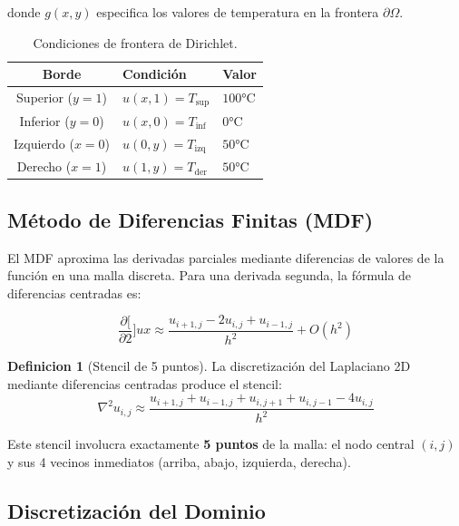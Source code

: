 \documentclass[12pt,a4paper]{article}
\theoremstyle{definition}
\newtheorem{definition}{Definicion}[section]
\newcommand{\diff}[2]{\frac{\partial #1}{\partial #2}}
\begin{document}
donde $g(x,y)$ especifica los valores de temperatura en la frontera $\partial\Omega$.

\begin{table}[H]
\centering
\caption{Condiciones de frontera de Dirichlet.}
\label{tab:fronteras}
\begin{tabular}{@{}cll@{}}
\toprule
\textbf{Borde} & \textbf{Condici\'{o}n} & \textbf{Valor} \\ \midrule
Superior ($y = 1$) & $u(x, 1) = T_{\text{sup}}$ & $100\text{°C}$ \\
Inferior ($y = 0$) & $u(x, 0) = T_{\text{inf}}$ & $0\text{°C}$ \\
Izquierdo ($x = 0$) & $u(0, y) = T_{\text{izq}}$ & $50\text{°C}$ \\
Derecho ($x = 1$) & $u(1, y) = T_{\text{der}}$ & $50\text{°C}$ \\ \bottomrule
\end{tabular}
\end{table}

\subsection{M\'{e}todo de Diferencias Finitas (MDF)}

El MDF aproxima las derivadas parciales mediante diferencias de valores de la funci\'{o}n en una malla discreta. Para una derivada segunda, la f\'{o}rmula de diferencias centradas es:

\begin{equation}\label{eq:diff2}
\diff[2]{u}{x} \approx \frac{u_{i+1,j} - 2u_{i,j} + u_{i-1,j}}{h^2} + O(h^2)
\end{equation}

\begin{definition}[Stencil de 5 puntos]
La discretizaci\'{o}n del Laplaciano 2D mediante diferencias centradas produce el stencil:
\begin{equation}\label{eq:laplaciano_discreto}
\nabla^2 u_{i,j} \approx \frac{u_{i+1,j} + u_{i-1,j} + u_{i,j+1} + u_{i,j-1} - 4u_{i,j}}{h^2}
\end{equation}
\end{definition}

Este stencil involucra exactamente \textbf{5 puntos} de la malla: el nodo central $(i,j)$ y sus 4 vecinos inmediatos (arriba, abajo, izquierda, derecha).

\subsection{Discretizaci\'{o}n del Dominio}
\end{document}
